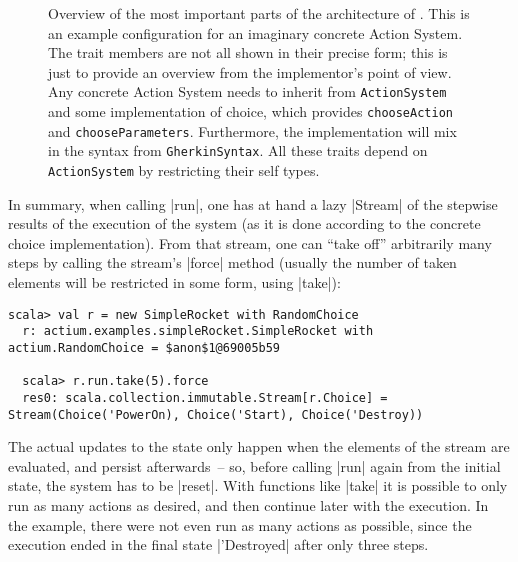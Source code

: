 \begin{sidewaysfigure}[p!]
  \caption{\footnotesize Overview of the most important parts of the architecture of \actium{}. This
    is an example configuration for an imaginary concrete Action System. The trait members are not
    all shown in their precise form; this is just to provide an overview from the implementor's
    point of view. Any concrete Action System needs to inherit from
    \lstinline[columns=fixed]|ActionSystem| and some implementation of choice, which provides
    \lstinline[columns=fixed]|chooseAction| and
    \lstinline[columns=fixed]|chooseParameters|. Furthermore, the implementation will mix in the
    \dsl{} syntax from \lstinline[columns=fixed]|GherkinSyntax|.  All these traits depend on
    \lstinline[columns=fixed]|ActionSystem| by restricting their self
    types.\label{fig:architecture}}
\end{sidewaysfigure}

In summary, when calling |run|, one has at hand a lazy |Stream| of the stepwise results of the
execution of the system (as it is done according to the concrete choice implementation). From that
stream, one can \enquote{take off} arbitrarily many steps by calling the stream's |force| method
(usually the number of taken elements will be restricted in some form, \eg using |take|):
\begin{lstlisting}[style=break-lines]
  scala> val r = new SimpleRocket with RandomChoice
  r: actium.examples.simpleRocket.SimpleRocket with actium.RandomChoice = $anon$1@69005b59

  scala> r.run.take(5).force
  res0: scala.collection.immutable.Stream[r.Choice] = Stream(Choice('PowerOn), Choice('Start), Choice('Destroy))
\end{lstlisting}
The actual updates to the state only happen when the elements of the stream are evaluated, and
persist afterwards~-- so, before calling |run| again from the initial state, the system has to be
|reset|. With functions like |take| it is possible to only run as many actions as desired, and then
continue later with the execution. In the example, there were not even run as many actions as
possible, since the execution ended in the final state |'Destroyed| after only three steps.

